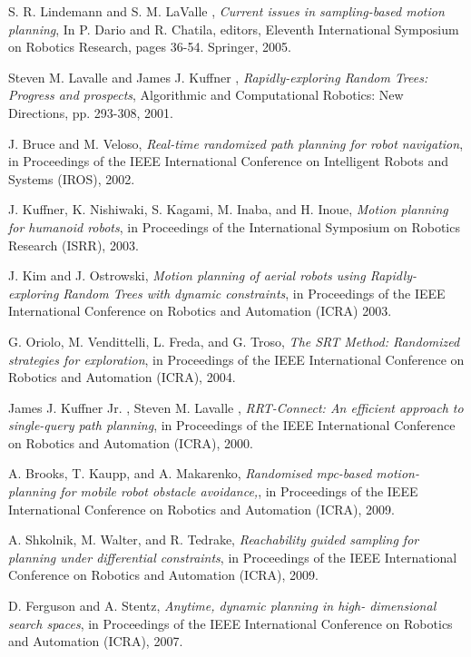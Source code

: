 \documentclass[MTech]{iitmdiss}
\begin{document}
\begin{thebibliography}{99}
	S. R. Lindemann and S. M. LaValle ,
  \emph{Current issues in sampling-based motion planning},
	In P. Dario and R. Chatila, editors, Eleventh International Symposium on Robotics Research, pages 36-54. Springer,
	2005.	 

	Steven M. Lavalle and James J. Kuffner ,
  \emph{Rapidly-exploring Random Trees: Progress and prospects},
	 Algorithmic and Computational Robotics: New Directions, pp. 293-308,
	2001.	 
	
	J. Bruce and M. Veloso,
  \emph{Real-time randomized path planning for robot navigation},
	in Proceedings of the IEEE International Conference on Intelligent Robots and Systems (IROS),
	2002.	 
	
	J. Kuffner, K. Nishiwaki, S. Kagami, M. Inaba, and H. Inoue,
  \emph{Motion planning for humanoid robots},
	in Proceedings of the International Symposium on Robotics Research (ISRR),
	2003.	 
	

	J. Kim and J. Ostrowski,
  \emph{Motion planning of aerial robots using Rapidly-exploring Random Trees with dynamic constraints},
	in Proceedings of the IEEE International Conference on Robotics and Automation (ICRA)
	2003.	 
	

	 G. Oriolo, M. Vendittelli, L. Freda, and G. Troso,
  \emph{The SRT Method: Randomized strategies for exploration},
	in Proceedings of the IEEE International Conference on Robotics and Automation (ICRA),
	2004.	 


	 James J. Kuffner Jr. , Steven M. Lavalle ,
  \emph{RRT-Connect: An efficient approach to single-query path planning},
	in Proceedings of the IEEE International Conference on Robotics and Automation (ICRA),
	2000.	

	 A. Brooks, T. Kaupp, and A. Makarenko,
  \emph{Randomised mpc-based motion-planning for mobile robot obstacle avoidance,},
	in Proceedings of the IEEE International Conference on Robotics and Automation (ICRA),
	2009.	

	 A. Shkolnik, M. Walter, and R. Tedrake,
  \emph{Reachability guided sampling for planning under differential constraints},
	in Proceedings of the IEEE International Conference on Robotics and Automation (ICRA),
	2009.	

	D. Ferguson and A. Stentz,
  \emph{Anytime, dynamic planning in high- dimensional search spaces},
	in Proceedings of the IEEE International Conference on Robotics and Automation (ICRA),
	2007.	
	


\end{thebibliography}
\end{document}
